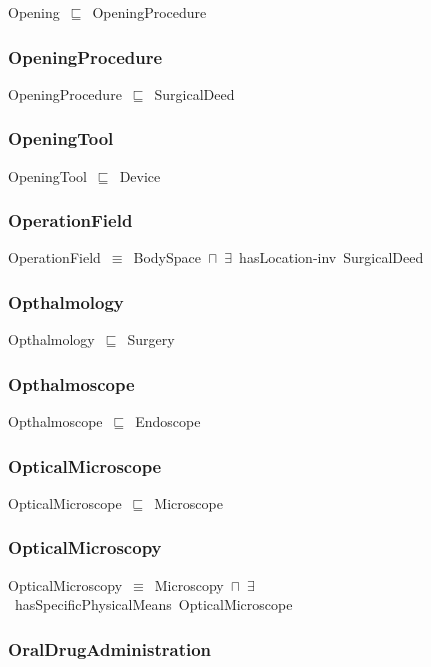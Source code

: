 \documentclass{article}
\begin{document}
Opening~\ensuremath{\sqsubseteq}~OpeningProcedure~

\subsubsection*{OpeningProcedure}

OpeningProcedure~\ensuremath{\sqsubseteq}~SurgicalDeed~

\subsubsection*{OpeningTool}

OpeningTool~\ensuremath{\sqsubseteq}~Device~

\subsubsection*{OperationField}

OperationField~\ensuremath{\equiv}~BodySpace~\ensuremath{\sqcap}~\ensuremath{\exists}~hasLocation-inv~SurgicalDeed

\subsubsection*{Opthalmology}

Opthalmology~\ensuremath{\sqsubseteq}~Surgery~

\subsubsection*{Opthalmoscope}

Opthalmoscope~\ensuremath{\sqsubseteq}~Endoscope~

\subsubsection*{OpticalMicroscope}

OpticalMicroscope~\ensuremath{\sqsubseteq}~Microscope~

\subsubsection*{OpticalMicroscopy}

OpticalMicroscopy~\ensuremath{\equiv}~Microscopy~\ensuremath{\sqcap}~\ensuremath{\exists}~hasSpecificPhysicalMeans~OpticalMicroscope

\subsubsection*{OralDrugAdministration}
\end{document}

